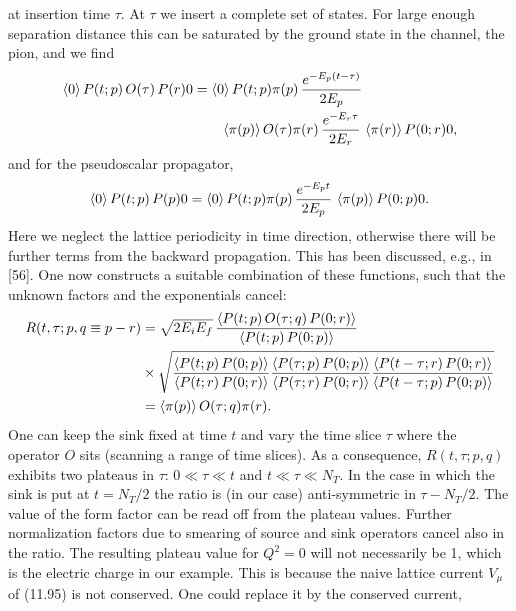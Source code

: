 at insertion time $\tau$. At $\tau$ we insert a complete set of states. For large enough
separation distance this can be saturated by the ground state in the channel,
the pion, and we find
\begin{equation}
\begin{aligned}
\left\langle 0 \right\rangle{P(t; p)\, O(\tau)\, P(r)}{0}
&= \left\langle 0 \right\rangle{P(t; p)}{\pi(p)}\,
\frac{e^{-E_p(t-\tau)}}{2E_p}\\
&\qquad \left\langle \pi(p) \right\rangle{O(\tau)}{\pi(r)}\,
\frac{e^{-E_r\tau}}{2E_r}\,
\left\langle \pi(r) \right\rangle{P(0; r)}{0} ,
\end{aligned}
\end{equation}
and for the pseudoscalar propagator,
\begin{equation}
\left\langle 0 \right\rangle{P(t; p)\, P(p)}{0}
= \left\langle 0 \right\rangle{P(t; p)}{\pi(p)}\,
\frac{e^{-E_p t}}{2E_p}\,
\left\langle \pi(p) \right\rangle{P(0; p)}{0} .
\end{equation}
Here we neglect the lattice periodicity in time direction, otherwise there will
be further terms from the backward propagation. This has been discussed,
e.g., in [56].
One now constructs a suitable combination of these functions, such that
the unknown factors and the exponentials cancel:
\begin{equation}
\begin{aligned}
R(t, \tau; p, q \equiv p - r)
&= \sqrt{2E_iE_f}\,
\frac{\left\langle P(t; p)\, O(\tau; q)\, P(0; r) \right\rangle}{\left\langle P(t; p)\, P(0; p) \right\rangle} \\
&\times
\sqrt{
  \frac{\left\langle P(t; p)\, P(0; p) \right\rangle}{\left\langle P(t; r)\, P(0; r) \right\rangle}
  \frac{\left\langle P(\tau; p)\, P(0; p) \right\rangle}{\left\langle P(\tau; r)\, P(0; r) \right\rangle}
  \frac{\left\langle P(t - \tau; r)\, P(0; r) \right\rangle}{\left\langle P(t - \tau; p)\, P(0; p) \right\rangle}} \\
&= \left\langle \pi(p) \right\rangle{O(\tau; q)}{\pi(r)} .
\end{aligned}
\end{equation}
One can keep the sink fixed at time $t$ and vary the time slice $\tau$ where the
operator $O$ sits (scanning a range of time slices). As a consequence, $R(t, \tau; p, q)$
exhibits two plateaus in $\tau$: $0 \ll \tau \ll t$ and $t \ll \tau \ll N_T$. In the case in
which the sink is put at $t = N_T/2$ the ratio is (in our case) anti-symmetric in
$\tau - N_T/2$. The value of the form factor can be read off from the plateau values.
Further normalization factors due to smearing of source and sink operators
cancel also in the ratio.
The resulting plateau value for $Q^2 = 0$ will not necessarily be 1, which is
the electric charge in our example. This is because the naive lattice current
$V_\mu$ of (11.95) is not conserved. One could replace it by the conserved current,
